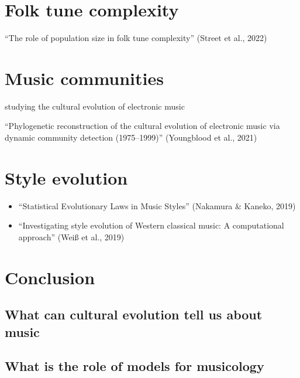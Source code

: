 \documentclass[
  a4paperpaper,
  ,captions=tableheading
]{scrbook}
\providecommand{\tightlist}{%
  \setlength{\itemsep}{0pt}\setlength{\parskip}{0pt}}
\begin{document}
\hypertarget{folk-tune-complexity}{%
\chapter{Folk tune complexity}\label{folk-tune-complexity}}

``The role of population size in folk tune complexity'' (Street et al.,
2022)

\hypertarget{music-communities}{%
\chapter{Music communities}\label{music-communities}}

studying the cultural evolution of electronic music

\hfill\break

``Phylogenetic reconstruction of the cultural evolution of electronic
music via dynamic community detection (1975--1999)'' (Youngblood et al.,
2021)

\hypertarget{style-evolution}{%
\chapter{Style evolution}\label{style-evolution}}

\begin{itemize}
\tightlist
\item
  ``Statistical Evolutionary Laws in Music Styles'' (Nakamura \& Kaneko,
  2019)
\item
  ``Investigating style evolution of Western classical music: A
  computational approach'' (Weiß et al., 2019)
\end{itemize}


\hypertarget{sec-conclusion}{%
\chapter{Conclusion}\label{sec-conclusion}}

\hypertarget{what-can-cultural-evolution-tell-us-about-music}{%
\section{What can cultural evolution tell us about
music}\label{what-can-cultural-evolution-tell-us-about-music}}

\hypertarget{what-is-the-role-of-models-for-musicology}{%
\section{What is the role of models for
musicology}\label{what-is-the-role-of-models-for-musicology}}
\end{document}
